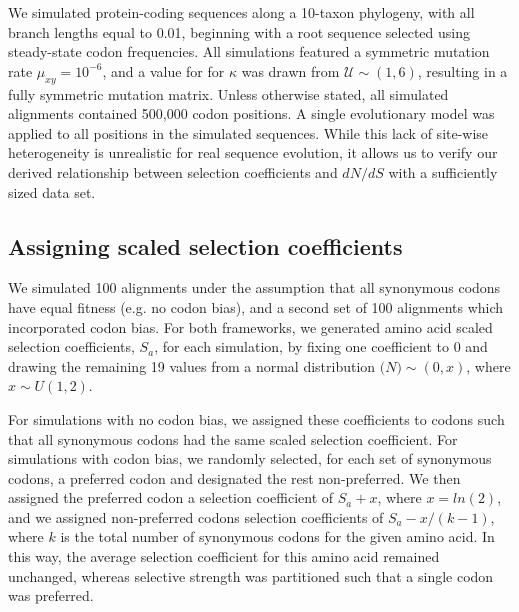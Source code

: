 \documentclass[11pt]{article}
\begin{document}
We simulated protein-coding sequences along a 10-taxon phylogeny, with all branch lengths equal to 0.01, beginning with a root sequence selected using steady-state codon frequencies. All simulations featured a symmetric mutation rate $\mu_{xy} = 10^{-6}$, and a value for for $\kappa$ was drawn from $\mathcal{U} \sim (1,6)$, resulting in a fully symmetric mutation matrix. Unless otherwise stated, all simulated alignments contained 500,000 codon positions. A single evolutionary model was applied to all positions in the simulated sequences. While this lack of site-wise heterogeneity is unrealistic for real sequence evolution, it allows us to verify our derived relationship between selection coefficients and $dN/dS$ with a sufficiently sized data set.

\subsection*{Assigning scaled selection coefficients}

We simulated 100 alignments under the assumption that all synonymous codons have equal fitness (e.g. no codon bias), and a second set of 100 alignments which incorporated codon bias. For both frameworks, we generated amino acid scaled selection coefficients, $S_a$, for each simulation, by fixing one coefficient to 0 and drawing the remaining 19 values from a normal distribution $\mathcal(N)\sim(0,x)$, where $x \sim U(1,2)$. 

For simulations with no codon bias, we assigned these coefficients to codons such that all synonymous codons had the same scaled selection coefficient. For simulations with codon bias, we randomly selected, for each set of synonymous codons, a preferred codon and designated the rest non-preferred. We then assigned the preferred codon a selection coefficient of $S_a + x$, where $x=ln(2)$, and we assigned non-preferred codons selection coefficients of $S_a - x/(k-1)$, where $k$ is the total number of synonymous codons for the given amino acid. In this way, the average selection coefficient for this amino acid remained unchanged, whereas selective strength was partitioned such that a single codon was preferred.
\end{document}
